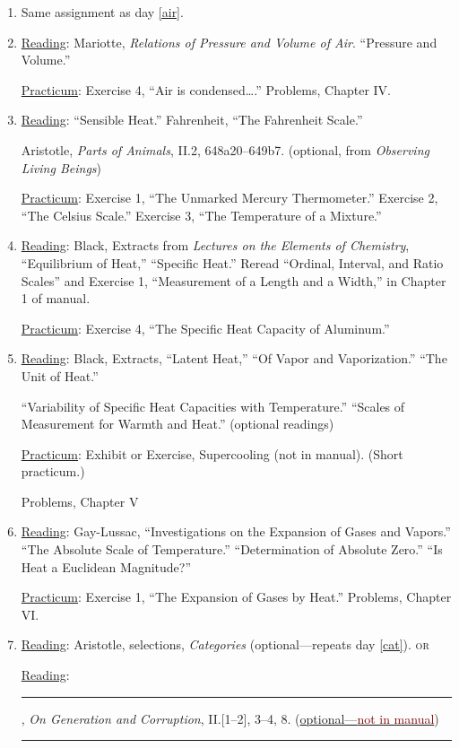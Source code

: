 \documentclass{article}
\newcommand{\rd}{\uline{Reading}}
\newcommand{\pc}{\uline{Practicum}}
\begin{document}
\begin{enumerate}
\pc: Exercise 1, ``Construction of a Barometer.'' In place of a mercury barometer, make a water barometer in the pendulum pit.
Exercise 2: ``The Experiment of Perier.'' Instead of constructing barometers, read barometers installed at the Boathouse and in the McDowell cupola; bring semi-inflated taped balloons.
The Cartesian diver. Exhibit 3: “The Constant Flow Reservoir.” 

\item Same assignment as day \ref{air}.

\item \rd:  Mariotte, \emph{Relations of Pressure and Volume of Air}. ``Pressure and Volume.'' 

	\pc: Exercise 4, ``Air is condensed\dots.'' Problems, Chapter IV.
\item \rd:  ``Sensible Heat.'' Fahrenheit, ``The Fahrenheit
	Scale.''
	
	Aristotle, \emph{Parts of Animals}, II.2, 648a20--649b7. (optional, from \emph{Observing Living Beings}) 

	\pc: Exercise 1, ``The Unmarked Mercury Thermometer.'' Exercise 2, ``The Celsius Scale.'' Exercise 3, ``The Temperature of a Mixture.''

\item \rd: Black, Extracts from \emph{Lectures on the Elements of Chemistry}, ``Equilibrium of Heat,'' ``Specific Heat.'' Reread ``Ordinal, Interval, and Ratio Scales'' and Exercise 1,
``Measurement of a Length and a Width,'' in Chapter 1 of manual. 

	\pc: Exercise 4, ``The Specific Heat Capacity of Aluminum.''

\item \rd: Black, Extracts, ``Latent Heat,'' ``Of Vapor and Vaporization.'' ``The Unit of Heat.'' 

``Variability of Specific Heat Capacities with
Temperature.'' ``Scales of Measurement for Warmth and Heat.'' (optional readings)

	\pc: Exhibit or Exercise,  Supercooling (not in manual). (Short practicum.) 
	
	Problems, Chapter V

\item \rd: Gay-Lussac, ``Investigations on the Expansion of Gases
and Vapors.'' ``The Absolute Scale of Temperature.'' ``Determination of Absolute Zero.'' ``Is
Heat a Euclidean Magnitude?''

\pc: Exercise 1, ``The Expansion of Gases by Heat.'' Problems, Chapter VI.

\item \rd: Aristotle, selections, \emph{Categories} (optional---repeats day \ref{cat}). \textsc{or}

\rd: \rule[0ex]{8mm}{0.5pt}, \emph{On Generation and Corruption}, II.[1--2], 3--4, 8. (\hyperlink{generation.1}{optional---\textcolor{Maroon}{not in manual}}) \rule{1.2ex}{1.2ex}
\end{enumerate}
\end{document}
